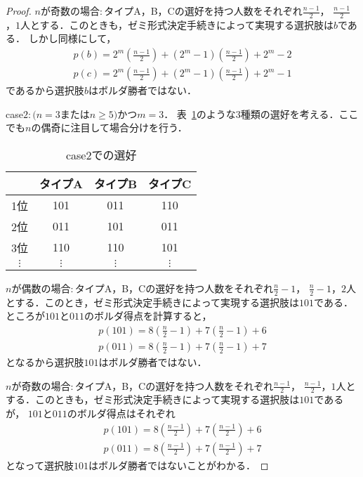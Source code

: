 \documentclass[dvipdfmx]{jsarticle}
\begin{document}
\begin{proof}
  \noindent{}$n$が奇数の場合$\colon$タイプA，B，Cの選好を持つ人数をそれぞれ$\frac{n-1}{2}$，
  $\frac{n-1}{2}$，$1$人とする．このときも，ゼミ形式決定手続きによって実現する選択肢は$b$である．
  しかし同様にして，
  \begin{gather*}
    p(b) = 2^m(\frac{n-1}{2}) + (2^m-1)(\frac{n-1}{2}) + 2^m - 2 \\
    p(c) = 2^m(\frac{n-1}{2}) + (2^m-1)(\frac{n-1}{2}) + 2^m - 1
  \end{gather*}
  であるから選択肢$b$はボルダ勝者ではない．

  \noindent{}case$2\colon$$(n = 3$または$n \geq 5)$かつ$m = 3$．
  表~\ref{tab:case2}のような$3$種類の選好を考える．ここでも$n$の偶奇に注目して場合分けを行う．
  \begin{table}[h]
    \caption{case2での選好}\label{tab:case2}
    \begin{center}
      \begin{tabular}{c|c|c|c}\hline
            & タイプA & タイプB & タイプC \\ \hline
        1位 & 101 & 011 & 110 \\ 
        2位 & 011 & 101 & 011 \\ 
        3位 & 110 & 110 & 101 \\ 
        $\vdots$ & $\vdots$ & $\vdots$ & $\vdots$ \\ \hline
      \end{tabular}
    \end{center}
  \end{table}

  \noindent{}$n$が偶数の場合$\colon$タイプA，B，Cの選好を持つ人数をそれぞれ$\frac{n}{2}-1$，
  $\frac{n}{2}-1$，$2$人とする．このとき，ゼミ形式決定手続きによって実現する選択肢は$101$である．
  ところが$101$と$011$のボルダ得点を計算すると，
  \begin{gather*}
    p(101) = 8(\frac{n}{2}-1) + 7(\frac{n}{2}-1) + 6 \\
    p(011) = 8(\frac{n}{2}-1) + 7(\frac{n}{2}-1) + 7
  \end{gather*}
  となるから選択肢$101$はボルダ勝者ではない．

  \noindent{}$n$が奇数の場合$\colon$タイプA，B，Cの選好を持つ人数をそれぞれ$\frac{n-1}{2}$，
  $\frac{n-1}{2}$，$1$人とする．このときも，ゼミ形式決定手続きによって実現する選択肢は$101$であるが，
  $101$と$011$のボルダ得点はそれぞれ
  \begin{gather*}
    p(101) = 8(\frac{n-1}{2}) + 7(\frac{n-1}{2}) + 6 \\
    p(011) = 8(\frac{n-1}{2}) + 7(\frac{n-1}{2}) + 7
  \end{gather*}
  となって選択肢$101$はボルダ勝者ではないことがわかる．


\end{proof}
\end{document}

